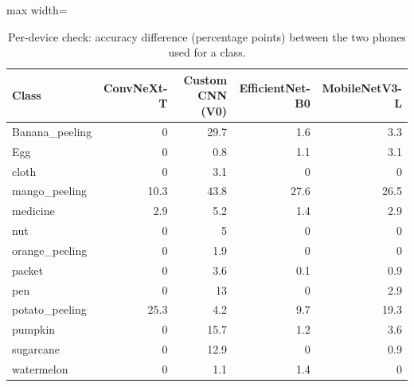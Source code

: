 \begin{table}[!htbp]
\centering
\scriptsize
\caption{Per-device check: accuracy difference (percentage points) between the two phones used for a class.}
\label{tab:s_device}
\begin{adjustbox}{max width=\textwidth}
\begin{tabular}{@{}lrrrr@{}}
\toprule
Class & ConvNeXt-T & Custom CNN (V0) & EfficientNet-B0 & MobileNetV3-L \\
\midrule
Banana\_peeling & 0 & 29.7 & 1.6 & 3.3 \\
Egg & 0 & 0.8 & 1.1 & 3.1 \\
cloth & 0 & 3.1 & 0 & 0 \\
mango\_peeling & 10.3 & 43.8 & 27.6 & 26.5 \\
medicine & 2.9 & 5.2 & 1.4 & 2.9 \\
nut & 0 & 5 & 0 & 0 \\
orange\_peeling & 0 & 1.9 & 0 & 0 \\
packet & 0 & 3.6 & 0.1 & 0.9 \\
pen & 0 & 13 & 0 & 2.9 \\
potato\_peeling & 25.3 & 4.2 & 9.7 & 19.3 \\
pumpkin & 0 & 15.7 & 1.2 & 3.6 \\
sugarcane & 0 & 12.9 & 0 & 0.9 \\
watermelon & 0 & 1.1 & 1.4 & 0 \\
\bottomrule
\end{tabular}
\end{adjustbox}
\end{table}

